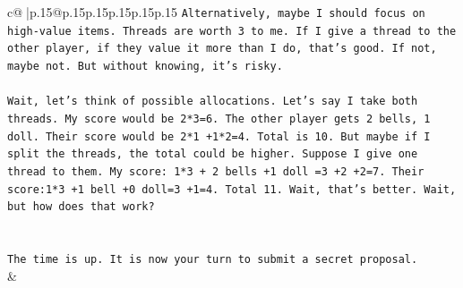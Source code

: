 \documentclass{article}
\begin{document}
{\begin{supertabular}{c@{$\;$}|p{.15\linewidth}@{}p{.15\linewidth}p{.15\linewidth}p{.15\linewidth}p{.15\linewidth}p{.15\linewidth}}
{{{\texttt{Alternatively, maybe I should focus on high{-}value items. Threads are worth 3 to me. If I give a thread to the other player, if they value it more than I do, that's good. If not, maybe not. But without knowing, it's risky.} \\
\\ 
\texttt{Wait, let's think of possible allocations. Let's say I take both threads. My score would be 2*3=6. The other player gets 2 bells, 1 doll. Their score would be 2*1 +1*2=4. Total is 10. But maybe if I split the threads, the total could be higher. Suppose I give one thread to them. My score: 1*3 + 2 bells +1 doll =3 +2 +2=7. Their score:1*3 +1 bell +0 doll=3 +1=4. Total 11. Wait, that's better. Wait, but how does that work?} \\
\\ 
\\ 
\texttt{The time is up. It is now your turn to submit a secret proposal.} \\
            }
        }
    }
    & \\ \\


\end{supertabular}}
\end{document}
